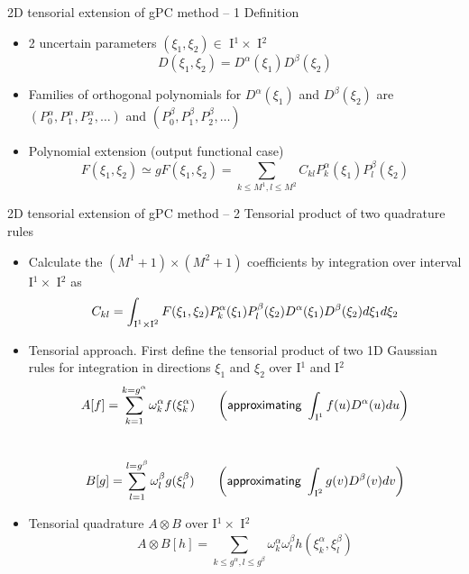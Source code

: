 \documentclass[10pt]{beamer}
\def\vo{\vspace{1mm}}
\def\vr{\vspace{3mm}}
\def\begit{\begin{itemize}}
\def\endit{\end{itemize}}
\def\Ir{{\textrm I}}
\begin{document}
%
%
\begin{frame}{2D tensorial extension of gPC method -- 1}{ Definition }
%
\footnotesize{
\begit
%
\item 2 uncertain parameters  $(\xi_1,\xi_2) \in$ \Ir$^1 \times$ \Ir$^2 $ 
%
                   $$ D(\xi_1,\xi_2) = D^{\alpha}(\xi_1)D^{\beta}(\xi_2)$$ 
\vo
\item Families of orthogonal polynomials for  $D^\alpha(\xi_1)$ and $D^\beta(\xi_2)$ are $(P^\alpha_0,P^\alpha_1,P^\alpha_2,\dots)$
 and $(P^\beta_0,P^\beta_1,P^\beta_2,\dots)$
%
\vr
\item Polynomial extension (output functional case)
% 
     $$ F(\xi_1,\xi_2) \simeq gF(\xi_1,\xi_2) = \sum_{k\leq M^1,l \leq M^2} C_{kl} P^\alpha_k (\xi_1)  P^\beta_l (\xi_2)$$
%
\endit  }
%
\end{frame}
%
%
\begin{frame}{2D tensorial extension of gPC method -- 2}{ Tensorial product of two quadrature rules}
%
\footnotesize{
%
\begit
%
\item Calculate the $  (M^1+1)\times (M^2+1)$ coefficients by integration over interval \Ir$^1 \times$ \Ir$^2$ as 
%
    $$ C_{kl} = \int_{\Ir^1\times \Ir^2}  F(\xi_1, \xi_2)  P^\alpha_k (\xi_1)  P^\beta_l (\xi_2) D^\alpha(\xi_1)D^\beta(\xi_2) d\xi_1 d\xi_2 $$
%
\item Tensorial approach. First define the  tensorial product of two 1D Gaussian rules for integration in directions $\xi_1$ and $\xi_2$
 over \Ir$^1$ and \Ir$^2$ 
%
      $$  A[f] = \sum_{k=1}^{k=g^\alpha} \omega^\alpha_k f(\xi^\alpha_k) ~~~~~\left( \textsf{approximating }  \int_{\Ir^1 }f(u) D^\alpha(u) du \right) $$ ~~~~ 
      $$  B[g] = \sum_{l=1}^{l=g^\beta} \omega^\beta_l g(\xi^\beta_l) ~~~~~\left( \textsf{approximating }   \int_ {\Ir^2} g(v) D^\beta(v) dv \right ) $$
%
\item Tensorial quadrature  $A \otimes B$ over \Ir$^1 \times$ \Ir$^2$
        $$ A \otimes B[h] = \sum_{k\leq g^\alpha, l \leq g^\beta} \omega^\alpha_k \omega^\beta_l h(\xi^\alpha_k, \xi^\beta_l) $$
%
\endit
%
}
%
\end{frame}
%
%
\end{document}
